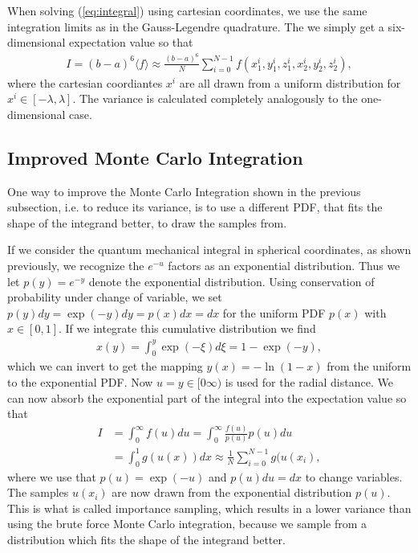 \documentclass[10pt, twocolumn]{aastex62}
\begin{document}
When solving (\ref{eq:integral}) using cartesian coordinates, we use the same
integration limits as in the Gauss-Legendre quadrature. The we simply get a
six-dimensional expectation value so that 
\begin{align}
	I = (b-a)^6\langle f \rangle \approx \frac{(b-a)^6}{N}\sum^{N-1}_{i=0} f(x_1^i, y_1^i, z_1^i, x_2^i, y_2^i, z_2^i),
\end{align}
where the cartesian coordiantes $x^i$ are all drawn from a uniform distribution
for $x^i\in[-\lambda, \lambda]$. The variance is calculated completely analogously
to the one-dimensional case. 

\subsection{Improved Monte Carlo Integration}\label{subsec:improved_monte_carlo}
One way to improve the Monte Carlo Integration shown in the previous subsection,
i.e. to reduce its variance, is to use a different PDF, that fits the shape of
the integrand better, to draw the samples from.

If we consider the quantum mechanical integral in spherical coordinates, as
shown previously, we recognize the $e^{-u}$ factors as an exponential
distribution. Thus we let $p(y) = e^{-y}$ denote the exponential distribution.
Using conservation of probability under change of variable, we set $p(y)dy =
\exp(-y)dy = p(x)dx = dx$ for the uniform PDF $p(x)$ with $x\in[0,1]$. If we
integrate this cumulative distribution we find 
\begin{align}
	x(y) = \int^y_0 \exp(-\xi)d\xi = 1 - \exp(-y),
\end{align} 
which we can invert to get the mapping $y(x) = -\ln(1-x)$ from the uniform to
the exponential PDF. Now $u = y\in[0\infty)$ is used for the radial distance. We
can now absorb the exponential part of the integral into the expectation value
so that 
\begin{align}
	I &= \int^\infty_0 f(u)du = \int_0^\infty \frac{f(u)}{p(u)}p(u)du \\
	&= \int^1_0 g(u(x))dx \approx \frac{1}{N}\sum_{i=0}^{N-1} g(u(x_i), 
\end{align}
where we use that $p(u) = \exp(-u)$ and $p(u)du = dx$ to change variables.
The samples $u(x_i)$ are now drawn from the exponential distribution $p(u)$.
This is what is called importance sampling, which results in a lower variance
than using the brute force Monte Carlo integration, because we sample
from a distribution which fits the shape of the integrand better. 
\end{document}
